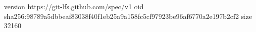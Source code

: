 version https://git-lfs.github.com/spec/v1
oid sha256:98789a5dbbeaf83038f40f1eb25a9a158fc5cf97923be96af6770a2e197b2cf2
size 32160
